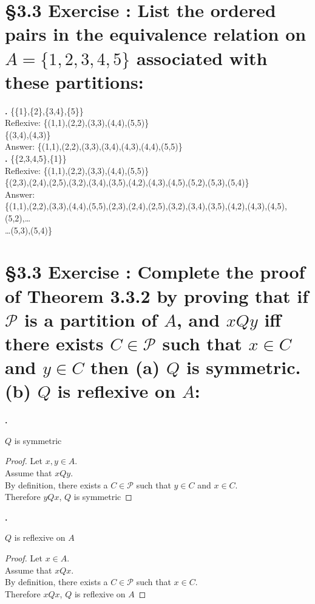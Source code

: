 \documentclass[a4paper,11pt]{article}
\begin{document}
\section*{\S 3.3 Exercise : List the ordered pairs in the equivalence relation on \(A = \{1,2,3,4,5\}\) associated
with these partitions:}
\setcounter{SubsectionCounter}{2}
\textbf{.}
\{\{1\},\{2\},\{3,4\},\{5\}\}\\
Reflexive: \{{(1,1)},{(2,2)},{(3,3)},{(4,4)},{(5,5)}\}\\
\{{(3,4)},{(4,3)}\}\\
Answer: \{{(1,1)},{(2,2)},{(3,3)},{(3,4)},{(4,3)},{(4,4)},{(5,5)}\}\\
\setcounter{SubsectionCounter}{3}
\textbf{.}
\{\{2,3,4,5\},\{1\}\}\\
Reflexive: \{{(1,1)},{(2,2)},{(3,3)},{(4,4)},{(5,5)}\}\\
\{{(2,3)},{(2,4)},{(2,5)},{(3,2)},{(3,4),{(3,5)},{(4,2)},{(4,3)},{(4,5)},{(5,2)},{(5,3)},{(5,4)}}\}\\
Answer:\\
\{{(1,1)},{(2,2)},{(3,3)},{(4,4)},{(5,5)},{(2,3)},{(2,4)},{(2,5)},{(3,2)},{(3,4),{(3,5)},{(4,2)},{(4,3)},{(4,5)},{(5,2)},\ldots\\\ldots{(5,3)},{(5,4)}}\}
\newpage
\setcounter{ProblemCounter}{10}
\section*{\S 3.3 Exercise : Complete the proof of Theorem 3.3.2 by proving that if \(\mathscr{P}\) is a partition of \(A\), and \(x Q y\) iff there exists \(C \in \mathscr{P}\) such that \(x \in C\) and \(y \in C\) then \bf{(a)} \(Q\) is symmetric. \bf{(b)} \(Q\) is reflexive on \(A\):}
\setcounter{SubsectionCounter}{1}
\textbf{.}
\begin{theorem1}
  \(Q\) is symmetric
  \begin{proof}
    Let \(x,y \in A\).\\
    Assume that \(x Q y\).\\
    By definition, there exists a \(C \in \mathscr{P}\) such that \(y \in C\) 
    and \(x \in C\).\\
    Therefore \(y Q x\), \(Q\) is symmetric
  \end{proof}
\end{theorem1}
\setcounter{SubsectionCounter}{2}
\textbf{.}
\begin{theorem1}
  \(Q\) is reflexive on \(A\)
  \begin{proof}
    Let \(x \in A\).\\
    Assume that \(x Q x\).\\
    By definition, there exists a \(C \in \mathscr{P}\) such that \(x \in C\).\\
    Therefore \(x Q x\), \(Q\) is reflexive on \(A\)
  \end{proof}
\end{theorem1}
\end{document}
